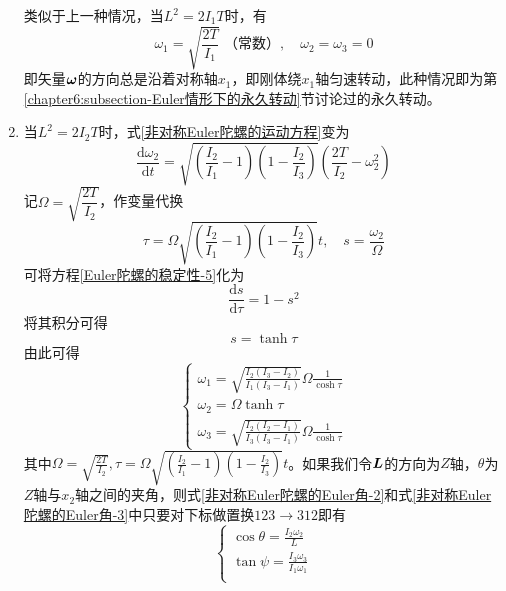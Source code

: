 \begin{enumerate}
类似于上一种情况，当$L^2=2I_1T$时，有
\begin{equation*}
	\omega_1 = \sqrt{\frac{2T}{I_1}}\,\,\text{（常数）},\quad \omega_2 = \omega_3 = 0
\end{equation*}
即矢量$\boldsymbol{\omega}$的方向总是沿着对称轴$x_1$，即刚体绕$x_1$轴匀速转动，此种情况即为第\ref{chapter6:subsection-Euler情形下的永久转动}节讨论过的永久转动。

\item 当$L^2=2I_2T$时，式\eqref{非对称Euler陀螺的运动方程}变为
\begin{equation}
	\frac{\mathrm{d}\omega_2}{\mathrm{d}t} = \sqrt{\left(\frac{I_2}{I_1}-1\right)\left(1-\frac{I_2}{I_3}\right)}\left(\frac{2T}{I_2}-\omega_2^2\right)
	\label{Euler陀螺的稳定性-5}
\end{equation}
记$\varOmega = \sqrt{\dfrac{2T}{I_2}}$，作变量代换
\begin{equation}
	\tau = \varOmega\sqrt{\left(\frac{I_2}{I_1}-1\right)\left(1-\frac{I_2}{I_3}\right)} t,\quad s = \frac{\omega_2}{\varOmega}
	\label{Euler陀螺的稳定性-6}
\end{equation}
可将方程\eqref{Euler陀螺的稳定性-5}化为
\begin{equation*}
	\frac{\mathrm{d}s}{\mathrm{d}\tau} = 1-s^2
\end{equation*}
将其积分可得
\begin{equation}
	s = \tanh \tau
\end{equation}
由此可得
\begin{equation}
\begin{cases}
	\displaystyle \omega_1 = \sqrt{\frac{I_2(I_3-I_2)}{I_1(I_3-I_1)}}\varOmega \frac{1}{\cosh \tau} \\
	\displaystyle \omega_2 = \varOmega \tanh \tau \\
	\displaystyle \omega_3 = \sqrt{\frac{I_2(I_2-I_1)}{I_3(I_3-I_1)}}\varOmega \frac{1}{\cosh \tau}
	\label{Euler陀螺的稳定性-7}
\end{cases}
\end{equation}
其中$\displaystyle \varOmega = \sqrt{\frac{2T}{I_2}},\tau = \varOmega\sqrt{\left(\frac{I_2}{I_1}-1\right)\left(1-\frac{I_2}{I_3}\right)} t$。如果我们令$\boldsymbol{L}$的方向为$Z$轴，$\theta$为$Z$轴与$x_2$轴之间的夹角，则式\eqref{非对称Euler陀螺的Euler角-2}和式\eqref{非对称Euler陀螺的Euler角-3}中只要对下标做置换$123\to 312$即有
\begin{equation}
\begin{cases}
	\displaystyle \cos\theta = \frac{I_2\omega_2}{L} \\[1.5ex]
	\displaystyle \tan\psi = \frac{I_3\omega_3}{I_1\omega_1} \\[1.5ex]

\end{cases}
\end{equation}
\end{enumerate}
